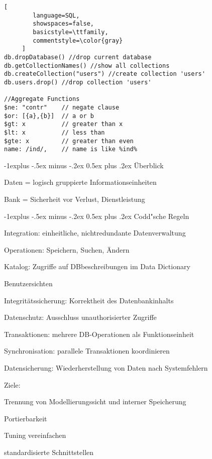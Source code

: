 \documentclass[a4paper]{article}
\makeatletter
\renewcommand{\subsection}{\@startsection{subsection}{2}{0mm}%
                                {-1explus -.5ex minus -.2ex}%
                                {0.5ex plus .2ex}%
                                {\normalfont\normalsize\bfseries}}
\makeatother
\begin{document}
\begin{multicols}{3}
\begin{lstlisting}[
        language=SQL,
        showspaces=false,
        basicstyle=\ttfamily,
        commentstyle=\color{gray}
     ]
db.dropDatabase() //drop current database
db.getCollectionNames() //show all collections
db.createCollection("users") //create collection 'users' 	
db.users.drop() //drop collection 'users'

//Aggregate Functions
$ne: "contr"    // negate clause
$or: [{a},{b}]  // a or b
$gt: x          // greater than x
$lt: x          // less than
$gte: x         // greater than even
name: /ind/,    // name is like %ind%

\end{lstlisting}

    \subsection{Überblick}
    \begin{itemize*}
        \item Daten = logisch gruppierte Informationseinheiten
        \item Bank = Sicherheit vor Verlust, Dienstleistung
    \end{itemize*}

    \subsection{Codd"sche Regeln}
    \begin{enumerate*}
        \item Integration: einheitliche, nichtredundante Datenverwaltung
        \item Operationen: Speichern, Suchen, Ändern
        \item Katalog: Zugriffe auf DBbeschreibungen im Data Dictionary
        \item Benutzersichten
        \item Integritätssicherung: Korrektheit des Datenbankinhalts
        \item Datenschutz: Ausschluss unauthorisierter Zugriffe
        \item Transaktionen: mehrere DB-Operationen als Funktionseinheit
        \item Synchronisation: parallele Transaktionen koordinieren
        \item Datensicherung: Wiederherstellung von Daten nach Systemfehlern
    \end{enumerate*}

    Ziele:
    \begin{itemize*}
        \item Trennung von Modellierungssicht und interner Speicherung
        \item Portierbarkeit
        \item Tuning vereinfachen
        \item standardisierte Schnittstellen
    \end{itemize*}


\end{multicols}
\end{document}
